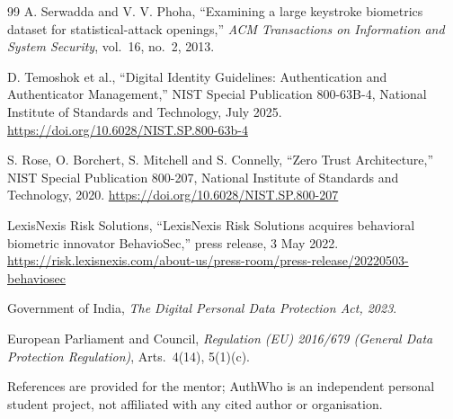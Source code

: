 \documentclass[10pt,letterpaper]{article}
\begin{document}
\begin{thebibliography}{99}
 A. Serwadda and V. V. Phoha, ``Examining a large keystroke biometrics dataset for statistical-attack openings,'' \emph{ACM Transactions on Information and System Security}, vol.~16, no.~2, 2013.

 D. Temoshok et al., ``Digital Identity Guidelines: Authentication and Authenticator Management,'' NIST Special Publication 800-63B-4, National Institute of Standards and Technology, July 2025. \url{https://doi.org/10.6028/NIST.SP.800-63b-4}

 S. Rose, O. Borchert, S. Mitchell and S. Connelly, ``Zero Trust Architecture,'' NIST Special Publication 800-207, National Institute of Standards and Technology, 2020. \url{https://doi.org/10.6028/NIST.SP.800-207}

 LexisNexis Risk Solutions, ``LexisNexis Risk Solutions acquires behavioral biometric innovator BehavioSec,'' press release, 3 May 2022. \url{https://risk.lexisnexis.com/about-us/press-room/press-release/20220503-behaviosec}

 Government of India, \emph{The Digital Personal Data Protection Act, 2023}.

 European Parliament and Council, \emph{Regulation (EU) 2016/679 (General Data Protection Regulation)}, Arts.~4(14), 5(1)(c).

\end{thebibliography}

{\small\color{slate} References are provided for the mentor; AuthWho is an independent personal student project, not affiliated with any cited author or organisation.\par}
\end{document}
